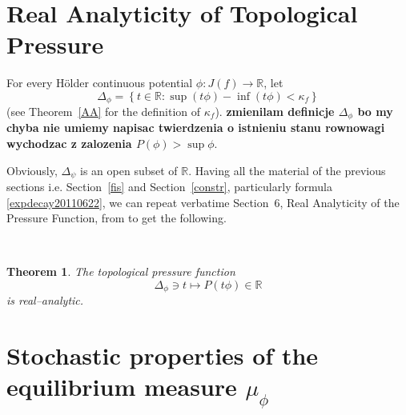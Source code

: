 \documentclass[12pt]{amsart}
\numberwithin{equation}{section}
\newcommand{\nl}{\newline}
\newtheorem{thm}{Theorem}[section]
\def\lt{\left}                \def\rt{\right}
\def\sp{\medskip}             \def\fr{\noindent}        \def\nl{\newline}
\begin{document}
\

\section{Real Analyticity of Topological Pressure}


\sp\fr For every H\"older continuous potential $\phi:J(f)\to\mathbb{R}$, let
$$\Delta_\phi=\lt\{t\in\mathbb{R}:\sup(t\phi)-\inf(t\phi)<\kappa_f\right \}$$
(see Theorem~\ref{AA} for the definition of $\kappa_f$).
{\bf zmienilam definicje $\Delta_\phi$ bo my chyba nie umiemy napisac twierdzenia o istnieniu stanu rownowagi wychodzac z zalozenia $P(\phi)>\sup \phi$}.

Obviously, $\Delta_\psi$ is an open subset of $\mathbb{R}$. Having all
the material of the previous sections 
i.e. Section~\ref{fis} and Section~\ref{constr}, particularly 
formula \eqref{expdecay20110622}, we can repeat verbatime Section~6,
Real Analyticity of the Pressure Function, from \cite{SUZ1} to get
the following. 

\

\begin{thm}\label{t1ai1}
The topological pressure function 
$$
\Delta_\phi\ni t\mapsto P(t\phi)\in\mathbb{R}
$$ 
is real--analytic.
\end{thm}

 
\section{Stochastic properties of the equilibrium
  measure $\mu_\phi$}\label{stochastic} 
\end{document}
